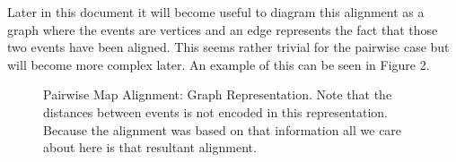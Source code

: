 \documentclass[11pt]{article}
\begin{document}
\par{
Later in this document it will become useful to diagram this alignment as a graph where the events are vertices and an edge represents the fact that those two events have been aligned.  This seems rather trivial for the pairwise case but will become more complex later.  An example of this can be seen in Figure 2.
}
\begin{figure}[h!]
\begin{center}
\caption{Pairwise Map Alignment: Graph Representation. Note that the distances between events is not encoded in this representation.  Because the alignment was based on that information all we care about here is that resultant alignment.}

\end{center}
\end{figure}
\end{document}
